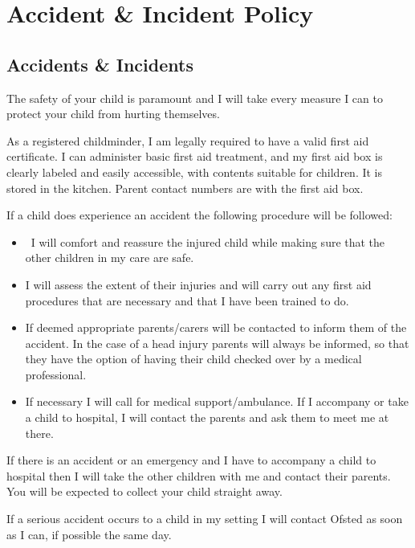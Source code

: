 

\section{Accident \& Incident Policy}

\subsection{Accidents \& Incidents}

The safety of your child is paramount and I will take every measure I
can to protect your child from hurting themselves.

As a registered childminder, I am legally required to have a valid first
aid certificate. I can administer basic first aid treatment, and my
first aid box is clearly labeled and easily accessible, with contents
suitable for children. It is stored in the kitchen. Parent contact
numbers are with the first aid box.

If a child does experience an accident the following procedure will be
followed:

\begin{itemize}
\item
  ~I will comfort and reassure the injured child while making sure that
  the other children in my care are safe.~
\item
  I will assess the extent of their injuries and will carry out any
  first aid procedures that are necessary and that I have been trained
  to do.~
\item
  If deemed appropriate parents/carers will be contacted to inform them
  of the accident. In the case of a head injury parents will always be 
  informed, so that they have the option of having their child checked 
  over by a medical professional.~
\item
  If necessary I will call for medical support/ambulance. If I
  accompany or take a child to hospital, I will contact the parents and
  ask them to meet me at there.~
\end{itemize}

If there is an accident or an emergency and I have to accompany a child
to hospital then I will take the other children with me and contact
their parents. You will be expected to collect your child straight away.

If a serious accident occurs to a child in my setting I will contact
Ofsted as soon as I can, if possible the same day.


